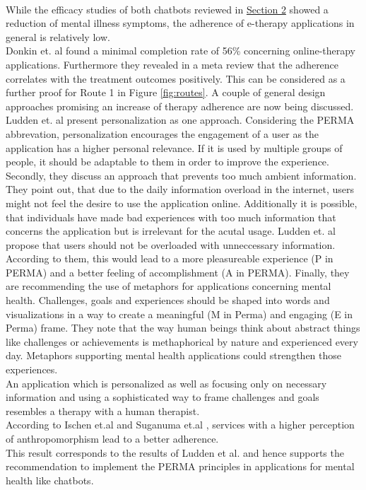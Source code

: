 \documentclass[sigconf, nonacm]{acmart}
\begin{document}
\\
While the efficacy studies of both chatbots reviewed in \hyperref[sec:two]{Section 2} showed a reduction of mental illness symptoms, the adherence of e-therapy applications in general is relatively low.\cite{Fitzpatrick2017, Ischen}
\\
Donkin et. al \cite{Donkin} found a minimal completion rate of 56\% concerning online-therapy applications. Furthermore they revealed in a meta review that the adherence correlates with the treatment outcomes positively\cite{Donkin2011}.
This can be considered as a further proof for Route 1 in Figure \ref{fig:routes}.  
A couple of general design approaches promising an increase of therapy adherence are now being discussed.
\\
Ludden et. al \cite{Ludden2015} present personalization as one approach. Considering the PERMA abbrevation, personalization encourages the engagement of a user as the application has a higher personal relevance. If it is used by multiple groups of people, it should be adaptable to them in order to improve the experience.
Secondly, they discuss an approach that prevents too much ambient information. They point out, that due to the daily information overload in the internet, users might not feel the desire to use the
application online. Additionally it is possible, that individuals have made bad experiences with too much information that concerns the application but is irrelevant for the acutal usage. 
Ludden et. al propose that users should not be overloaded with unneccessary information. According to them, this would lead to a more pleasureable experience (P in PERMA) and a better feeling of accomplishment (A in PERMA).
Finally, they are recommending the use of metaphors for applications concerning mental health. Challenges, goals and experiences should be shaped into words and visualizations in a way to create a meaningful (M in Perma) and engaging (E in Perma) frame.
They note that the way human beings think about abstract things like challenges or achievements is methaphorical by nature and experienced every day. Metaphors supporting mental health applications could strengthen those experiences.
\\
An application which is personalized as well as focusing only on necessary information and using a sophisticated way to frame challenges and goals resembles a therapy with a human therapist.
\\
According to Ischen et.al \cite{Ischen} and Suganuma et.al \cite{Suganuma2018}, services with a higher perception of anthropomorphism lead to a better adherence.
\\
This result corresponds to the results of Ludden et al. \cite{Ludden2015} and hence supports the recommendation to implement the PERMA principles in applications for mental health like chatbots. 
\\
\end{document}
